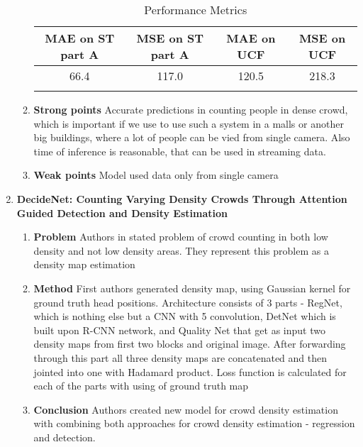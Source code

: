 \begin{enumerate}
\begin{enumerate}
        \begin{center}
            \begin{longtable}{cccc}
            \label{tab:locatesizecount} \\
            \hline
            MAE on ST part A &  MSE on ST part A & MAE on UCF & MSE on UCF\\
            \hline
            66.4 & 117.0 & 120.5 & 218.3 \\
            \hline
            \caption[Metrics table for Locate Size and Count in dense crowds]{Performance Metrics} 
            \end{longtable}
        \end{center}
        
        \item \textbf{Strong points}
        Accurate predictions in counting people in dense crowd, which is important if we use to use such a system in a malls or another big buildings, where a lot of people can be vied from single camera. Also time of inference is reasonable, that can be used in streaming data.
        \item \textbf{Weak points}
        Model used data only from single camera
    \end{enumerate}
    \item \textbf{DecideNet: Counting Varying Density Crowds Through Attention Guided Detection and Density Estimation}
    \begin{enumerate}
        \item \textbf{Problem}
        Authors in \cite{liu2017decidenet} stated problem of crowd counting in both low density and not low density areas. They represent this problem as a density map estimation 
        \item \textbf{Method}
        First authors generated density map, using Gaussian kernel for ground truth head positions. Architecture consists of 3 parts - RegNet, which is nothing else but a CNN with 5 convolution, DetNet which is built upon R-CNN network, and Quality Net that get as input two density maps from first two blocks and original image. After forwarding through this part all three density maps are concatenated and then jointed into one with Hadamard product. Loss function is calculated for each of the parts with using of ground truth map 
        \item \textbf{Conclusion}
        Authors created new model for crowd density estimation with combining both approaches for crowd density estimation - regression and detection. 

\end{enumerate}
\end{enumerate}
